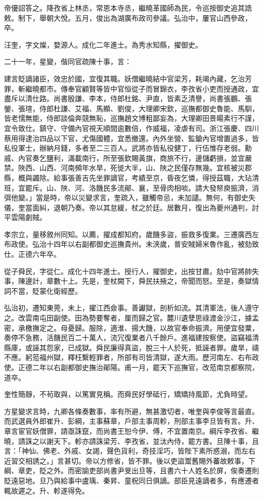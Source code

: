 \begin{pinyinscope}
帝優詔答之。降孜省上林丞，常恩本寺丞，繼曉革國師為民，令巡按御史追其誥敕。制下，舉朝大悅。五月，俊出為湖廣布政司參議。弘治中，屢官山西參政，卒。

汪奎，字文燦，婺源人。成化二年進士。為秀水知縣，擢御史。

二十一年，星變，偕同官疏陳十事，言：

建言貶謫諸臣，效忠於國，宜復其職。妖僧繼曉結中官梁芳，耗竭內藏，乞治芳罪，斬繼曉都市。傳奉官顧賢等皆中官恒從子而冒錦衣，李孜省小吏而授通政，宜盡斥以清仕路。尚書殷謙、李本，侍郎杜銘、尹直，皆素乏清譽，尚書張鵬、張鎣、張瑄，侍郎杜謙、艾福、馬顯、劉俊，大理卿宋欽，巡撫都御史魯能、馬馴，皆老懦無能，侍郎談倫奔競無恥，巡撫趙文博粗鄙妄為，大理卿田景暘素行不謹，宜令致仕。鎮守、守備內官視天順間逾數倍，作威福，凌虐有司。浙江張慶、四川蔡用得逮治四品以下官，尤傷國體，宜悉撤還。內外坐營、監鎗內官增置過多，皆私役軍士，辦納月錢，多者至二三百人。武將亦皆私役健丁，行伍惟存老弱。勳戚、內官奏乞鹽利，滿載南行，所至張欽賜黃旗，商旅不行，邊儲虧損，並宜嚴禁。陜西、山西、河南頻年水旱，死徙大半，山、陜之民僅存無幾。宜核被災郡縣，概與蠲除。給事張善吉先坐罪謫官，考績至京，昏夜乞憐，得授茲職，大玷清班，宜罷斥。山、陜、河、洛饑民多流鄖、襄，至骨肉相啖。請大發帑庾振濟，消弭他變。」當是時，帝以災變求言，奎疏入，雖觸帝忌，未加譴。無何，有御史失儀，奎當面糾，退朝乃奏。帝以其怠緩，杖之於廷。居數月，復出為夔州通判，討平雲陽劇賊。

孝宗立，量移敘州同知。以薦，擢成都知府。歲饑多盜，振救多復業。三遷廣西左布政使。弘治十四年以右副都御史巡撫貴州。未浹歲，普安賊婦米魯作亂，被劾致仕。正德六年卒。

從子舜民，字從仁。成化十四年進士。授行人，擢御史，出按甘肅。劾中官將帥失事，陳邊計，章數十上。先是，奎杖闕下，舜民扶掖之，帝聞而怒。至是，奏獄情詞不當，貶蒙化衛經歷。

弘治初，遷知東莞，未上，擢江西僉事。善讞獄，剖析如流。其清軍法，後人遵守之。改雲南屯田副使。田為勢要奪者，厘而歸之官。麓川遺孽思祿渡金沙江，據孟密，承檄撫定之。母憂歸。服除，適淮、揚大饑，以故官奉命振濟。用便宜發粟，奏停不急務，活饑民百二十萬人，流冗復業者八千餘戶。進福建按察使。盜竊福清縣庫，或誣其怨家，已成獄。舜民廉得真盜，脫三十人於死，抵誣者罪。歲旱，禱不應。躬蒞福州獄，釋枉繫輕罪者，所部有司皆清獄，遂大雨。歷河南左、右布政使。正德二年以右副都御史撫治鄖陽。甫一月，罷天下巡撫官，改蒞南京都察院，道卒。

奎性簡靜，不茍取與，以篤實見稱。而舜民好學砥行，矯矯持風節，尤負時望。

方星變求言時，九卿各條奏數事，率有所避，無甚激切者，唯奎與李俊等言最直。而武選員外郎崔升、彭綱，主事蘇章，戶部主事周軫，刑部主事李旦皆有言。升、章言宦官妖僧罪，請亟誅竄，而尚書王恕今伊、傅，不宜置南京。綱斥李孜省、繼曉，請誅之以謝天下。軫亦請誅梁芳、李孜省，並汰內侍，罷方書。旦陳十事，且言：「神仙、佛老、外戚、女謁，聲色貨利，奇技淫巧，皆陛下素所惑溺，而左右近習交相誘之。」言甚切。帝以方修省，皆不罪。後以吏盜鬻舊賜外蕃故敕事，下綱、章吏，貶之外。而密諭吏部尚書尹旻出旦等，且書六十人姓名於屏，俟奏遷則貶遠惡地。旦乃與給事中盧瑀、秦昇、童柷同日俱謫。部臣見遠謫者多，有應遷者輒故遲之。升、軫遂得免。


\end{pinyinscope}

